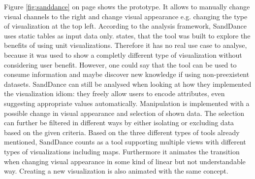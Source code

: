 Figure \ref{fig:sanddance} on page \pageref{fig:sanddance} shows the prototype. It allows to manually change visual channels to the right and change visual appearance e.g. changing the type of visualization at the top left. According to the analysis framework, SandDance uses static tables as input data only. \citeauthor{Drucker2015} states, that the tool was built to explore the benefits of using unit visualizations. Therefore it has no real use case to analyse, because it was used to show a completly different type of visualization without considering user benefit. However, one could say that the tool can be used to consume information and maybe discover new knowledge if using non-preexistent datasets.
SandDance can still be analysed when looking at how they implemented the visualization idiom: they freely allow users to encode attributes, even suggesting appropriate values automatically. Manipulation is implemented with a possible change in visual appearance and selection of shown data. The selection can further be filtered in different ways by either isolating or excluding data based on the given criteria.
Based on the three different types of tools already mentioned, SandDance counts as a tool supporting multiple views with different types of visualizations including maps. Furthermore it animates the transition when changing visual appearance in some kind of linear but not understandable way. Creating a new visualization is also animated with the same concept.

